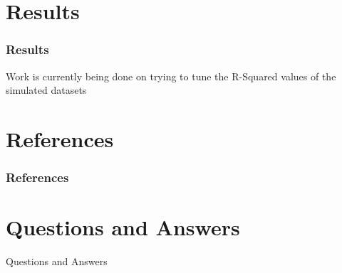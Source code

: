 \documentclass[]{beamer}
\begin{document}
\section{Results}

\begin{frame}
\frametitle{Results}
Work is currently being done on trying to tune the R-Squared values of the simulated datasets
\end{frame}

\section{References}
\begin{frame}
\frametitle{References}


\end{frame}

\section{Questions and Answers}

\begin{frame}
\begin{center}
\huge Questions and Answers
\end{center}
\end{frame}
\end{document}

